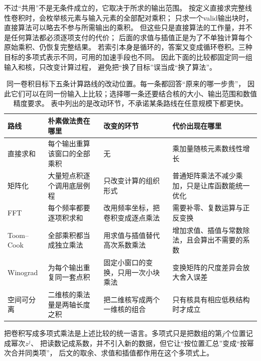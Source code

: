 不过“共用”不是无条件成立的，它取决于所求的输出范围。
按定义直接求完整线性卷积时，会枚举核元素与输入元素的全部配对乘积；
只求一个valid输出块时，直接算法可以略去不参与所需输出的乘积。
但这些只是直接算法的工作量，并不是任何算法都必须逐项支付的代价；
后面的求值与插值正是为了不单独计算每个原始乘积、仍恢复完整结果。
若索引本身是循环的，答案又变成循环卷积。三种目标的多项式表示不同，可用的加速手段也不同。
因此下面的比较都固定同一组输入和核，只改变计算过程，
避免把“换了目标”误当成“换了算法”。

\begin{table}[htbp]
  \centering
  \begin{tabularx}{\linewidth}{@{}lXXX@{}}
    \toprule
    路线 & 朴素做法贵在哪里 & 改变的环节 & 代价出现在哪里\\
    \midrule
    直接求和 & 每个输出重算该窗口的全部乘积 & 无 & 乘加量随核元素数线性增长\\
    矩阵化 & 大量短点积逐个调用底层例程 & 只改变计算的组织形式 & 普通矩阵乘法不减少乘加，只是让库函数能统一优化\\
    FFT & 每个频率都要逐项积求和 & 改用频率坐标，把卷积变成逐点乘法 & 需要补零、复数运算与正反变换\\
    Toom--Cook & 全部乘积都当成独立乘法 & 用求值与插值替代高次系数乘法 & 增加求值、插值与常数除法，且会算出不需要的系数\\
    Winograd & 为每个输出重复同一套点积 & 固定小窗口的变换，只用一次小块乘法 & 变换矩阵的尺度差异会放大舍入误差\\
    空间可分离 & 二维核的乘法量是两轴长度之积 & 把二维核写成两个一维核的组合 & 只有核具有相应低秩结构时才成立\\
    \bottomrule
  \end{tabularx}
  \caption{同一卷积目标下五条计算路线的改动位置。每一条都回答“原来的哪一步贵”，
  因此它们可以在同一份输入上比较；选择哪一条还要结合核的大小、输出范围和数值精度要求。
  表中列出的是改动环节，不承诺某条路线在任意规模下都更快。}
  \label{tab:signal-analysis-fast-transform-roadmap}
\end{table}

把卷积写成多项式乘法是上述比较的统一语言。多项式只是把数组的第$j$个位置记成幂次$z^j$、
把读数记成系数，并不引入新的数据，但它让“按位置汇总”变成“按幂次合并同类项”，
后文的取余、求值和插值都作用在这个多项式上。

